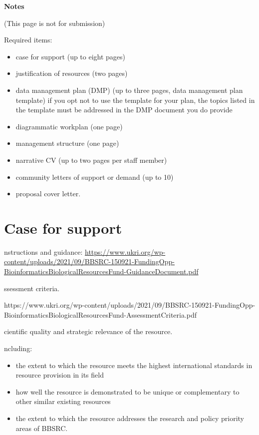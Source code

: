 \documentclass[a4paper,11point]{article}
\title{}
\author{}
\def\ii#1\par{{\color{blue!40}\sl #1}\par}
\def\iibf#1\par{{\color{blue!40}\sl\bfseries #1}\par}
\begin{document}
\noindent\textbf{Notes}

(This page is not for submission)

Required items:
\begin{itemize}  
  \item case for support (up to eight pages)
  \item justification of resources (two pages)
  \item data management plan (DMP) (up to three pages, data management plan template)
        if you opt not to use the template for your plan, the topics listed in the template must be addressed in the DMP document you do provide
  \item diagrammatic workplan (one page)
  \item management structure (one page)
  \item narrative CV (up to two pages per staff member)
  \item community letters of support or demand (up to 10)  
  \item proposal cover letter.
\end{itemize}

\tableofcontents
    
\newpage



\section{Case for support}

\ii Instructions and guidance:
  \url{https://www.ukri.org/wp-content/uploads/2021/09/BBSRC-150921-FundingOpp-BioinformaticsBiologicalResourcesFund-GuidanceDocument.pdf}

\iibf Assessment criteria.

\ii \url{https://www.ukri.org/wp-content/uploads/2021/09/BBSRC-150921-FundingOpp-BioinformaticsBiologicalResourcesFund-AssessmentCriteria.pdf}

\iibf Scientific quality and strategic relevance of the resource.

\ii Including:
\begin{itemize}[nosep]
    \item the extent to which the resource meets the highest international standards in resource provision in its field
    \item how well the resource is demonstrated to be unique or complementary to other similar existing resources
    \item the extent to which the resource addresses the research and policy priority areas of BBSRC.
\end{itemize}
\end{document}
